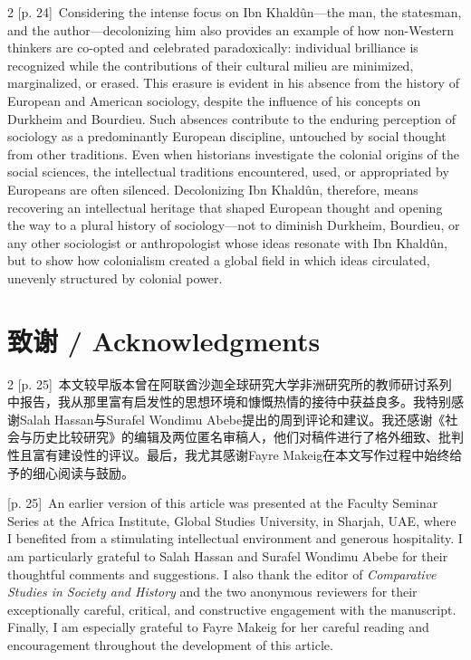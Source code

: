 \documentclass[10pt,a4paper]{article}
\begin{document}
\begin{paracol}{2}
{\scriptsize\color{gray} [p. 24]}\ Considering the intense focus on Ibn Khaldûn—the man, the statesman, and the author—decolonizing him also provides an example of how non-Western thinkers are co-opted and celebrated paradoxically: individual brilliance is recognized while the contributions of their cultural milieu are minimized, marginalized, or erased. This erasure is evident in his absence from the history of European and American sociology, despite the influence of his concepts on Durkheim and Bourdieu. Such absences contribute to the enduring perception of sociology as a predominantly European discipline, untouched by social thought from other traditions. Even when historians investigate the colonial origins of the social sciences, the intellectual traditions encountered, used, or appropriated by Europeans are often silenced. Decolonizing Ibn Khaldûn, therefore, means recovering an intellectual heritage that shaped European thought and opening the way to a plural history of sociology—not to diminish Durkheim, Bourdieu, or any other sociologist or anthropologist whose ideas resonate with Ibn Khaldûn, but to show how colonialism created a global field in which ideas circulated, unevenly structured by colonial power.\par
\switchcolumn*
\end{paracol}
\section*{致谢 / Acknowledgments}
\begin{paracol}{2}
{\scriptsize\color{gray} [p. 25]}\ 本文较早版本曾在阿联酋沙迦全球研究大学非洲研究所的教师研讨系列中报告，我从那里富有启发性的思想环境和慷慨热情的接待中获益良多。我特别感谢Salah Hassan与Surafel Wondimu Abebe提出的周到评论和建议。我还感谢《社会与历史比较研究》的编辑及两位匿名审稿人，他们对稿件进行了格外细致、批判性且富有建设性的评议。最后，我尤其感谢Fayre Makeig在本文写作过程中始终给予的细心阅读与鼓励。\par
\switchcolumn
{\scriptsize\color{gray} [p. 25]}\ An earlier version of this article was presented at the Faculty Seminar Series at the Africa Institute, Global Studies University, in Sharjah, UAE, where I benefited from a stimulating intellectual environment and generous hospitality. I am particularly grateful to Salah Hassan and Surafel Wondimu Abebe for their thoughtful comments and suggestions. I also thank the editor of \textit{Comparative Studies in Society and History} and the two anonymous reviewers for their exceptionally careful, critical, and constructive engagement with the manuscript. Finally, I am especially grateful to Fayre Makeig for her careful reading and encouragement throughout the development of this article.\par
\switchcolumn*
\end{paracol}
\end{document}
